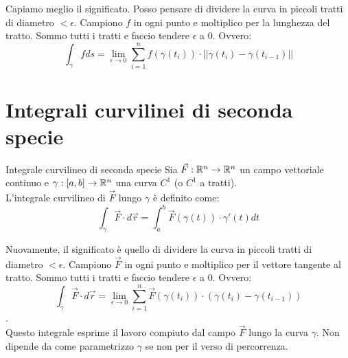 Capiamo meglio il significato. Posso pensare di dividere la curva in piccoli tratti di diametro $< \epsilon$. Campiono $f$ in ogni punto e moltiplico per la lunghezza del tratto. Sommo tutti i tratti e faccio tendere $\epsilon$ a 0. Ovvero:
$$\int_\gamma f ds = \lim_{\epsilon \rightarrow 0} \sum_{i=1}^n f(\gamma(t_i)) \cdot ||\gamma(t_i) - \gamma(t_{i-1})||$$

\section{Integrali curvilinei di seconda specie}\label{sec:integrali-curvilinei-di-seconda-specie}
\begin{definizione}{Integrale curvilineo di seconda specie}
  Sia $\vec F: \mathbb{R}^n \rightarrow \mathbb{R}^n$ un campo vettoriale continuo e $\gamma: [a, b] \rightarrow \mathbb{R}^n$ una curva $C^1$ (o $C^1$ a tratti).\\
  L'integrale curvilineo di $\vec F$ lungo $\gamma$ è definito come:
  $$\int_\gamma \vec F \cdot d\vec r = \int_a^b \vec F(\gamma(t)) \cdot \gamma'(t) dt$$
\end{definizione}

Nuovamente, il significato è quello di dividere la curva in piccoli tratti di diametro $< \epsilon$. Campiono $\vec F$ in ogni punto e moltiplico per il vettore tangente al tratto. Sommo tutti i tratti e faccio tendere $\epsilon$ a 0. Ovvero:
$$\int_\gamma \vec F \cdot d\vec r = \lim_{\epsilon \rightarrow 0} \sum_{i=1}^n \vec F(\gamma(t_i)) \cdot (\gamma(t_i) - \gamma(t_{i-1}))$$.\\
Questo integrale esprime il lavoro compiuto dal campo $\vec F$ lungo la curva $\gamma$. Non dipende da come parametrizzo $\gamma$ se non per il verso di percorrenza.
